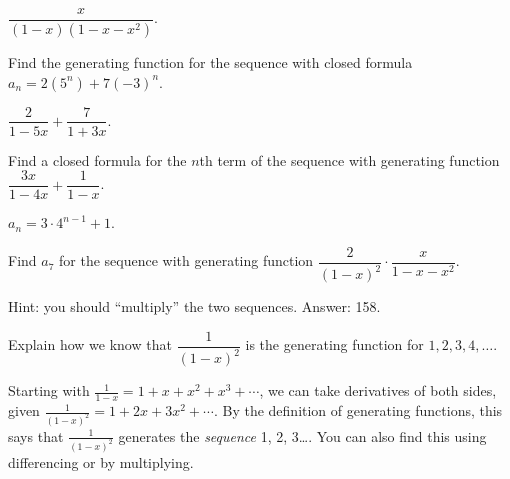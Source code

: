 \begin{questions}
	\begin{answer}
		$\dfrac{x}{(1-x)(1-x-x^2)}$.  %
	\end{answer}






\question Find the generating function for the sequence with closed formula $a_n = 2(5^n) + 7(-3)^n$.

	\begin{answer}
		$\dfrac{2}{1-5x} + \dfrac{7}{1+3x}$.  %
	\end{answer}






\question Find a closed formula for the $n$th term of the sequence with generating function $\dfrac{3x}{1-4x} + \dfrac{1}{1-x}$.

	\begin{answer}
		$a_n = 3\cdot 4^{n-1} + 1$.  %
	\end{answer}






\question Find $a_7$ for the sequence with generating function $\dfrac{2}{(1-x)^2}\cdot\dfrac{x}{1-x-x^2}$.

	\begin{answer}
		Hint: you should ``multiply'' the two sequences.  Answer: 158.  %
	\end{answer}





\question Explain how we know that $\dfrac{1}{(1-x)^2}$ is the generating function for $1, 2, 3, 4, \ldots$.

	\begin{answer}
		Starting with $\frac{1}{1-x} = 1 + x + x^2 + x^3 +\cdots$, we can take derivatives of both sides, given $\frac{1}{(1-x)^2} = 1 + 2x + 3x^2 + \cdots$.  By the definition of generating functions, this says that $\frac{1}{(1-x)^2}$ generates the {\em sequence} 1, 2, 3\ldots.  You can also find this using differencing or by multiplying.
	\end{answer}






\end{questions}
